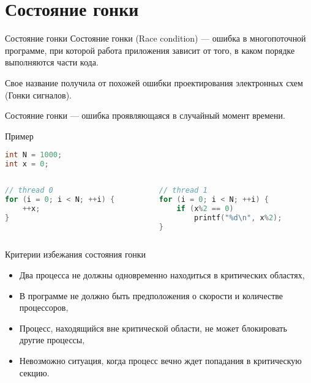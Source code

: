 \section{Состояние гонки}

\begin{frame}{Состояние гонки}
Состояние гонки (\abbr Race condition) --- ошибка в многопоточной программе, при которой работа приложения зависит от того, в каком порядке выполняются части кода.
\vspace*{0.5cm}

Свое название получила от похожей ошибки проектирования электронных схем (Гонки сигналов).
\vspace*{0.5cm}

Состояние гонки --- ошибка проявляющаяся в случайный момент времени.
\end{frame}

\begin{frame}[fragile]{Пример}
\begin{lstlisting}[language=C++,basicstyle=\ttfamily,keywordstyle=\color{blue},basicstyle=\scriptsize]
int N = 1000;
int x = 0;
\end{lstlisting}

\begin{columns}[t]
    \begin{column}[T]{0.45\textwidth}
    \begin{lstlisting}[language=C++,basicstyle=\ttfamily,keywordstyle=\color{blue},basicstyle=\scriptsize]
// thread 0
for (i = 0; i < N; ++i) {
    ++x;
}
    \end{lstlisting}
    \end{column}
    \begin{column}[T]{0.45\textwidth}
    \begin{lstlisting}[language=C++,basicstyle=\ttfamily,keywordstyle=\color{blue},basicstyle=\scriptsize]
// thread 1
for (i = 0; i < N; ++i) {
    if (x%2 == 0)
        printf("%d\n", x%2);
}
    \end{lstlisting}
    \end{column}
\end{columns}
\end{frame}

\begin{frame}{Критерии избежания состояния гонки}
\begin{itemize}
    \item Два процесса не должны одновременно находиться в критических областях,
    \item В программе не должно быть предположения о скорости и количестве
    процессоров,
    \item Процесс, находящийся вне критической области, не может блокировать
    другие процессы,
    \item Невозможно ситуация, когда процесс вечно ждет попадания в критическую
    секцию.
\end{itemize}
\end{frame}

